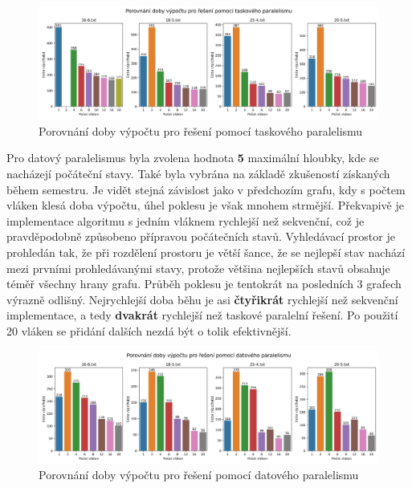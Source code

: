 \begin{figure}[!htbp]
\centerline{\includegraphics[scale=0.52]{report/images/parallel-task-graph.png}}
\caption{Porovnání doby výpočtu pro řešení pomocí taskového paralelismu}
\label{fig:task-graph.png}
\end{figure}
\FloatBarrier

Pro datový paralelismus byla zvolena hodnota \textbf{5} maximální hloubky, kde se nacházejí počáteční stavy.
Také byla vybrána na základě zkušeností získaných během semestru.
Je vidět stejná závislost jako v předchozím grafu, kdy s počtem vláken klesá doba výpočtu, úhel poklesu je však mnohem strmější.
Překvapivě je implementace algoritmu s jedním vláknem rychlejší než sekvenční, což je pravděpodobně způsobeno přípravou počátečních stavů.
Vyhledávací prostor je prohledán tak, že při rozdělení prostoru je větší šance, že se nejlepší stav nachází mezi prvními prohledávanými stavy, protože většina nejlepších stavů obsahuje téměř všechny hrany grafu.
Průběh poklesu je tentokrát na posledních 3 grafech výrazně odlišný.
Nejrychlejší doba běhu je asi \textbf{čtyřikrát} rychlejší než sekvenční implementace, a tedy \textbf{dvakrát} rychlejší než taskové paralelní řešení.
Po použití 20 vláken se přidání dalších nezdá být o tolik efektivnější.

\begin{figure}[!htbp]
\centerline{\includegraphics[scale=0.52]{report/images/parallel-data-graph.png}}
\caption{Porovnání doby výpočtu pro řešení pomocí datového paralelismu}
\label{fig:data-graph.png}
\end{figure}
\FloatBarrier

